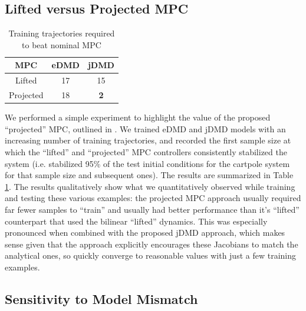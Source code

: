 \documentclass{article}
\begin{document}
\subsection{Lifted versus Projected MPC}
\begin{table}
  \vspace{-2\baselineskip}
  \begin{tabular}{ccc}\\
    \toprule  
    MPC       & {\color{orange} \textbf{eDMD}} & {\textbf{\color{cyan} jDMD}} \\
    \midrule
    Lifted    & 17   &          15 \\
    Projected & 18   &  \textbf{2} \\
    \bottomrule
  \end{tabular}
  \caption{Training trajectories required to beat nominal MPC}
  \vspace{-1\baselineskip}
  \label{tab:mpc_comp}
\end{table} 
      
We performed a simple experiment to highlight the value of the proposed ``projected'' MPC,
outlined in \label{sec:projected_mpc}. We trained eDMD and jDMD models with an increasing 
number of training trajectories, and recorded the first sample size at which the ``lifted''
and ``projected'' MPC controllers consistently stabilized the system (i.e. stabilized 95\%
of the test initial conditions for the cartpole system for that sample size and subsequent 
ones). The results are summarized in Table \ref{tab:mpc_comp}. The results qualitatively 
show what we quantitatively observed while training and testing these various examples:
the projected MPC approach usually required far fewer samples to ``train'' and usually had 
better performance than it's ``lifted'' counterpart that used the bilinear ``lifted'' 
dynamics. This was especially pronounced when combined with the proposed jDMD approach, 
which makes sense given that the approach explicitly encourages these Jacobians to match 
the analytical ones, so quickly converge to reasonable values with just a few training 
examples.

\subsection{Sensitivity to Model Mismatch}
\end{document}
